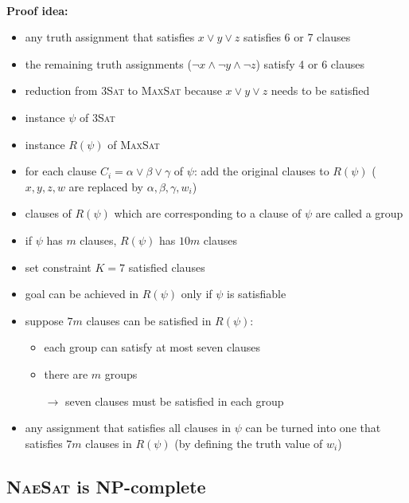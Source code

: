 \documentclass[a4]{scrartcl}
\begin{document}
\ \\
\textbf{Proof idea:}
\begin{itemize}
\item any truth assignment that satisfies $x \lor y \lor z$ satisfies 6 or 7 clauses
\item the remaining truth assignments ($\neg x \land \neg y \land \neg z$) satisfy 4 or 6 clauses
\item reduction from \textsc{3Sat} to \textsc{MaxSat} because $x \lor y \lor z$ needs to be satisfied
\item instance $\psi$ of \textsc{3Sat}
\item instance $R(\psi)$ of \textsc{MaxSat}
\item for each clause $C_i={\alpha \lor \beta \lor \gamma}$ of $\psi$: add the original clauses to $R(\psi)$ ($x, y, z ,w$ are replaced by $\alpha, \beta, \gamma, w_i$)
\item clauses of $R(\psi)$ which are corresponding to a clause of $\psi$ are called a group
\item if $\psi$ has $m$ clauses, $R(\psi)$ has $10m$ clauses
\item set constraint $K= 7$ satisfied clauses \\

\item goal can be achieved in $R(\psi)$ only if $\psi$ is satisfiable
\item suppose $7m$ clauses can be satisfied in $R(\psi)$: 
\begin{itemize}
\item each group can satisfy at most seven clauses
\item there are $m$ groups
\item[$\rightarrow$] seven clauses must be satisfied in each group \\

\end{itemize}

\item any assignment that satisfies all clauses in $\psi$ can be turned into one that satisfies $7m$ clauses in $R(\psi)$ (by defining the truth value of $w_i$)

\end{itemize}



\subsection*{\textsc{NaeSat} is NP-complete}
\end{document}
